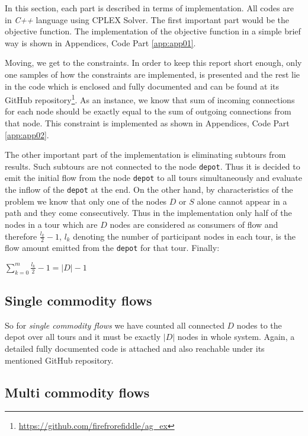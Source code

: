 In this section, each part is described in terms of implementation. All codes
are in {\it C++} language using CPLEX Solver.
The first important part would be the objective function. The implementation of
the objective function in a simple brief way is shown in Appendices, Code Part
\ref{app:app01}.

Moving, we get to the constraints. In order to keep this report short enough,
only one samples of how the constraints are implemented, is presented and the
rest lie in the code which is enclosed and fully documented and can be found at
its GitHub repository\footnote{\url{https://github.com/firefrorefiddle/ag_ex}}.
As an instance, we know that sum of incoming connections for each node should
be exactly equal to the sum of outgoing connections from that node. This
constraint is implemented as shown in Appendices, Code Part
\ref{app:app02}.

The other important part of the implementation is eliminating subtours from
results. Such subtours are not connected to the node \texttt{depot}. Thus it is
decided to emit the initial flow from the node \texttt{depot} to all tours
simultaneously and evaluate the inflow of the  \texttt{depot} at the end. On the
other hand, by characteristics of the problem we know that only one of the nodes
$D$ or $S$ alone cannot appear in a path and they come consecutively. Thus in
the implementation only half of the nodes in a tour which are $D$ nodes are
considered as consumers of flow and therefore $\frac{l_k}{2}-1$, $l_k$ denoting
the number of participant nodes in each tour, is the flow amount emitted from
the \texttt{depot} for that tour.
Finally:

\begin{center}
$\sum_{k=0}^{m}{\frac{l_k}{2}-1} = |D| - 1$
\end{center}

\subsection{Single commodity flows}

So for {\it single commodity flows} we have counted all connected $D$ nodes to
the depot over all tours and it must be exactly $|D|$ nodes in whole
system. Again, a detailed fully documented code is attached and also reachable
under its mentioned GitHub repository.

\subsection{Multi commodity flows}


